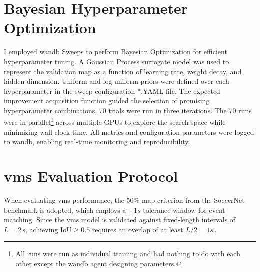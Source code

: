 
\section{Bayesian Hyperparameter Optimization}
\label{sec:bayesian_optimization}

I employed \acrshort{wandb} Sweeps to perform Bayesian Optimization for efficient hyperparameter tuning. A Gaussian Process surrogate model was used to represent the validation \acrshort{map} as a function of learning rate, weight decay, and hidden dimension. Uniform and log-uniform priors were defined over each hyperparameter in the sweep configuration *.YAML file. The expected improvement acquisition function guided the selection of promising hyperparameter combinations. 70 trials were run in three iterations. The 70 runs were in parallel\footnote{All runs were run as individual training and had nothing to do with each other except the \acrshort{wandb} agent designing parameters. } across multiple GPUs to explore the search space while minimizing wall-clock time. All metrics and configuration parameters were logged to \acrshort{wandb}, enabling real-time monitoring and reproducibility. 



\section{\acrshort{vms} Evaluation Protocol}
\label{sec:eval_protocol}
When evaluating \acrshort{vms} performance, the 50\% \acrshort{map} criterion from the SoccerNet benchmark is adopted, which employs a $\pm1s$ tolerance window for event matching. Since the \acrshort{vms} model is validated against fixed‐length intervals of $L = 2\,$s, achieving $\mathrm{IoU}\ge0.5$ requires an overlap of at least $L/2 = 1s\,$.

